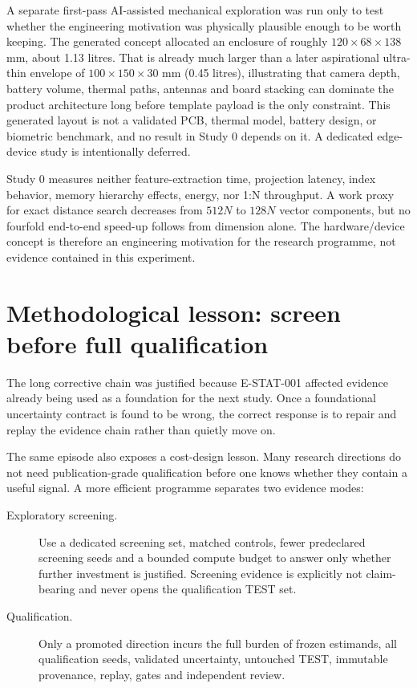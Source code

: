 \documentclass[10pt,a4paper]{article}
\begin{document}
A separate first-pass AI-assisted mechanical exploration was run only to test whether the
engineering motivation was physically plausible enough to be worth keeping. The generated
concept allocated an enclosure of roughly $120\times68\times138$ mm, about 1.13 litres. That
is already much larger than a later aspirational ultra-thin envelope of
$100\times150\times30$ mm (0.45 litres), illustrating that camera depth, battery volume,
thermal paths, antennas and board stacking can dominate the product architecture long before
template payload is the only constraint. This generated layout is not a validated PCB,
thermal model, battery design, or biometric benchmark, and no result in Study 0 depends on it.
A dedicated edge-device study is intentionally deferred.

Study 0 measures neither feature-extraction time, projection latency, index behavior,
memory hierarchy effects, energy, nor 1:N throughput. A work proxy for exact distance search
decreases from $512N$ to $128N$ vector components, but no fourfold end-to-end speed-up follows
from dimension alone. The hardware/device concept is therefore an engineering motivation for
the research programme, not evidence contained in this experiment.

\section{Methodological lesson: screen before full qualification}\label{sec:lesson}

The long corrective chain was justified because E-STAT-001 affected evidence already being
used as a foundation for the next study. Once a foundational uncertainty contract is found
to be wrong, the correct response is to repair and replay the evidence chain rather than
quietly move on.

The same episode also exposes a cost-design lesson. Many research directions do not need
publication-grade qualification before one knows whether they contain a useful signal. A
more efficient programme separates two evidence modes:

\begin{description}
\item[Exploratory screening.] Use a dedicated screening set, matched controls, fewer
predeclared screening seeds and a bounded compute budget to answer only whether further
investment is justified. Screening evidence is explicitly not claim-bearing and never
opens the qualification TEST set.
\item[Qualification.] Only a promoted direction incurs the full burden of frozen estimands,
all qualification seeds, validated uncertainty, untouched TEST, immutable provenance,
replay, gates and independent review.
\end{description}
\end{document}

